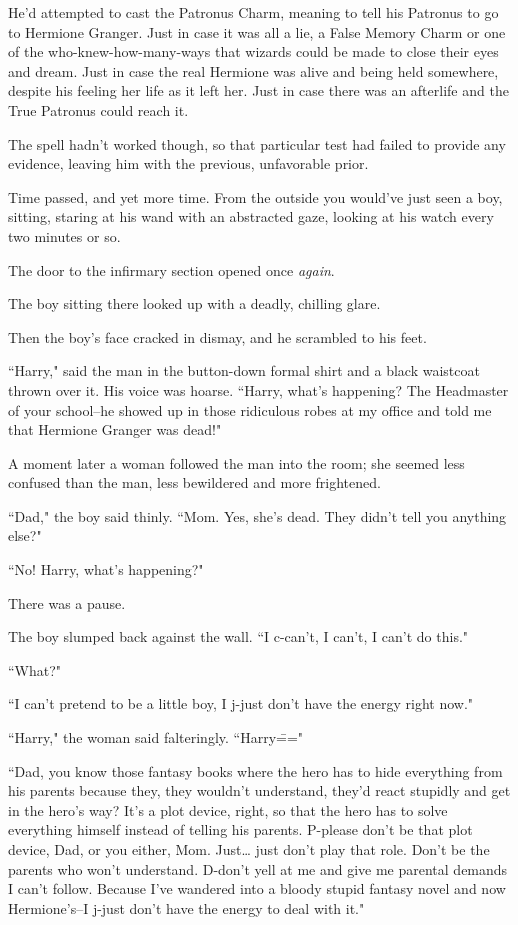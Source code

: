He'd attempted to cast the Patronus Charm, meaning to tell his Patronus to go to Hermione Granger. Just in case it was all a lie, a False Memory Charm or one of the who-knew-how-many-ways that wizards could be made to close their eyes and dream. Just in case the real Hermione was alive and being held somewhere, despite his feeling her life as it left her. Just in case there was an afterlife and the True Patronus could reach it.

The spell hadn't worked though, so that particular test had failed to provide any evidence, leaving him with the previous, unfavorable prior.

Time passed, and yet more time. From the outside you would've just seen a boy, sitting, staring at his wand with an abstracted gaze, looking at his watch every two minutes or so.

The door to the infirmary section opened once \emph{again}.

The boy sitting there looked up with a deadly, chilling glare.

Then the boy's face cracked in dismay, and he scrambled to his feet.

``Harry," said the man in the button-down formal shirt and a black waistcoat thrown over it. His voice was hoarse. ``Harry, what's happening? The Headmaster of your school\---he showed up in those ridiculous robes at my office and told me that Hermione Granger was dead!"

A moment later a woman followed the man into the room; she seemed less confused than the man, less bewildered and more frightened.

``Dad," the boy said thinly. ``Mom. Yes, she's dead. They didn't tell you anything else?"

``No! Harry, what's happening?"

There was a pause.

The boy slumped back against the wall. ``I c-can't, I can't, I can't do this."

``What?"

``I can't pretend to be a little boy, I j-just don't have the energy right now."

``Harry," the woman said falteringly. ``Harry\==="

``Dad, you know those fantasy books where the hero has to hide everything from his parents because they, they wouldn't understand, they'd react stupidly and get in the hero's way? It's a plot device, right, so that the hero has to solve everything himself instead of telling his parents. P-please don't be that plot device, Dad, or you either, Mom. Just{\ldots} just don't play that role. Don't be the parents who won't understand. D-don't yell at me and give me parental demands I can't follow. Because I've wandered into a bloody stupid fantasy novel and now Hermione's\---I j-just don't have the energy to deal with it."

